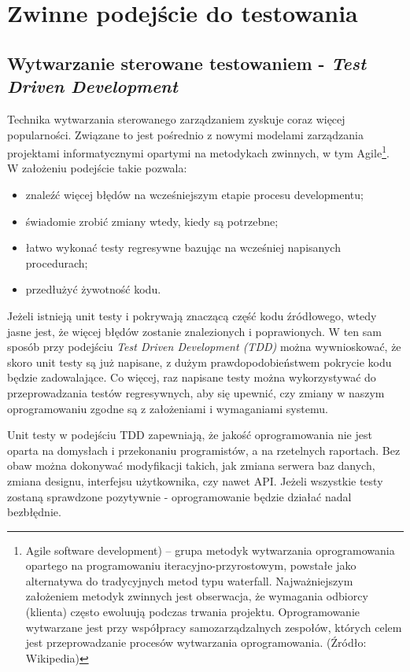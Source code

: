 \section{Zwinne podejście do testowania}
\subsection{Wytwarzanie sterowane testowaniem - \textit{Test Driven Development}}
\label{test_driven_development}
Technika wytwarzania sterowanego zarządzaniem zyskuje coraz więcej popularności. Związane to jest pośrednio z nowymi modelami zarządzania projektami informatycznymi opartymi na metodykach zwinnych, w tym Agile\footnote{Agile software development) – grupa metodyk wytwarzania oprogramowania opartego na programowaniu iteracyjno-przyrostowym, powstałe jako alternatywa do tradycyjnych metod typu waterfall. Najważniejszym założeniem metodyk zwinnych jest obserwacja, że wymagania odbiorcy (klienta) często ewoluują podczas trwania projektu. Oprogramowanie wytwarzane jest przy współpracy samozarządzalnych zespołów, których celem jest przeprowadzanie procesów wytwarzania oprogramowania. (Źródło: Wikipedia) }. W założeniu podejście takie pozwala:

\begin{itemize}
\item znaleźć więcej błędów na wcześniejszym etapie procesu developmentu;
\item świadomie zrobić zmiany wtedy, kiedy są potrzebne;
\item łatwo wykonać testy regresywne bazując na wcześniej napisanych procedurach;
\item przedłużyć żywotność kodu.
\end{itemize}

Jeżeli istnieją unit testy i pokrywają znaczącą część kodu źródłowego, wtedy jasne jest, że więcej błędów zostanie znalezionych i poprawionych. W ten sam sposób przy podejściu \textit{Test Driven Development (TDD)} można wywnioskować, że skoro unit testy są już napisane, z dużym prawdopodobieństwem pokrycie kodu będzie zadowalające. Co więcej, raz napisane testy można wykorzystywać do przeprowadzania testów regresywnych, aby się upewnić, czy zmiany w naszym oprogramowaniu zgodne są z założeniami i wymaganiami systemu.

Unit testy w podejściu TDD zapewniają, że jakość oprogramowania nie jest oparta na domysłach i przekonaniu programistów, a na rzetelnych raportach. Bez obaw można dokonywać modyfikacji takich, jak zmiana serwera baz danych, zmiana designu, interfejsu użytkownika, czy nawet API. Jeżeli wszystkie testy zostaną sprawdzone pozytywnie - oprogramowanie będzie działać nadal bezbłędnie.

